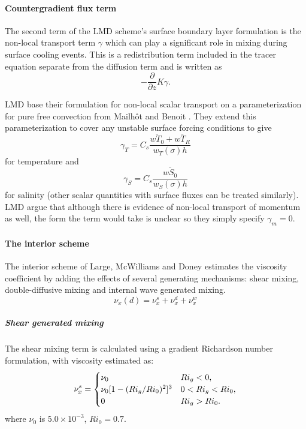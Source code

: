 \paragraph{Countergradient flux term}
The second term of the LMD scheme's surface boundary layer
formulation is the non-local transport term $\gamma$ which can play a
significant role in mixing during surface cooling events.  This is a
redistribution term included in the tracer equation separate from the
diffusion term and is written as 
\begin{equation}
-\frac{\partial}{\partial z}K\gamma.
\end{equation}

LMD base their formulation for non-local scalar transport on a
parameterization for pure free convection from Mailh\^ot and
Benoit \cite{Mailhot82}. They extend this parameterization to cover any
unstable surface forcing conditions to give
\begin{equation}
  \gamma_{T}=C_s\frac{\overline{wT_0}+
  \overline{wT_R}}{w_T(\sigma)h}
\end{equation}
for temperature and 
\begin{equation}
\gamma_S=C_s \frac{\overline{wS_0}}{w_S(\sigma)h}
\end{equation}
for salinity (other scalar quantities with surface fluxes can be
treated similarly). LMD argue that although there is evidence of
non-local transport of momentum as well, the form the term would take
is unclear so they simply specify $\gamma_m=0$.

\paragraph{The interior scheme}
The interior scheme of Large, McWilliams and Doney estimates the
viscosity coefficient by adding the effects of several generating
mechanisms:  shear mixing, double-diffusive mixing and internal wave
generated mixing.
\begin{equation}
\nu_{x}(d)=\nu_{x}^s+\nu_{x}^d+\nu_{x}^w
\end{equation}

\subparagraph{Shear generated mixing}
The shear mixing term is calculated using a
gradient Richardson number formulation,
with viscosity estimated as: 
\begin{equation}
\nu^s_x=\begin{cases}
\nu_0&   \text{$ Ri_g<0$}, \\
\nu_0[1-(Ri_g/Ri_0)^2]^3&  \text{$0< Ri_g<Ri_0$},  \\
0&   \text{$Ri_g>Ri_0$}.  
\end{cases}
\end{equation}
where $\nu_0$ is $5.0 \times 10^{-3}$, $Ri_0 = 0.7$.  

